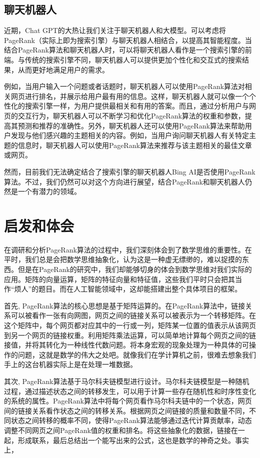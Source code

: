 \documentclass[UTF8,openany]{ctexbook}
\begin{document}
\section[聊天机器人]{聊天机器人}

近期，Chat GPT的大热让我们关注于聊天机器人和大模型。可以考虑将PageRank（实际上即为搜索引擎）与聊天机器人相结合，以提高其智能程度。当结合PageRank算法和聊天机器人时，可以将聊天机器人看作是一个搜索引擎的前端。与传统的搜索引擎不同，聊天机器人可以提供更加个性化和交互式的搜索结果，从而更好地满足用户的需求。

例如，当用户输入一个问题或者话题时，聊天机器人可以使用PageRank算法对相关网页进行排名，并展示给用户最有用的信息。这样，聊天机器人就可以像一个个性化的搜索引擎一样，为用户提供最相关和有用的答案。而且，通过分析用户与网页的交互行为，聊天机器人可以不断学习和优化PageRank算法的权重和参数，提高其预测和推荐的准确性。另外，聊天机器人还可以使用PageRank算法来帮助用户发现与他们感兴趣的主题相关的内容。例如，当用户询问聊天机器人有关特定主题的信息时，聊天机器人可以使用PageRank算法来推荐与该主题相关的最佳文章或网页。

然而，目前我们无法确定结合了搜索引擎的聊天机器人Bing AI是否使用PageRank算法。不过，我们仍然可以对这个方向进行展望，结合PageRank和聊天机器人仍然是一个有潜力的领域。

\chapter[启发和体会]{启发和体会}
\thispagestyle{fancy}

在调研和分析PageRank算法的过程中，我们深刻体会到了数学思维的重要性。在平时，我们总是会把数学思维抽象化，认为这是一种虚无缥缈的，难以捉摸的东西。但是在PageRank的研究中，我们却能够切身的体会到数学思维对我们实际的应用。矩阵的向量运算，矩阵的特征向量和特征值，这些我们平时只会把其当作“烦人”的题目。而在人工智能领域中，这却能搭建出整个具体项目的框架。

首先, PageRank算法的核心思想是基于矩阵运算的。在PageRank算法中，链接关系可以被看作一张有向网图，网页之间的链接关系可以被表示为一个转移矩阵。在这个矩阵中，每个网页都对应其中的一行或一列，矩阵某一位置的值表示从该网页到另一个网页的链接权重。利用矩阵乘法运算，可以简单地计算每个网页之间的链接值，并将其转化为一种线性代数问题。将本身宏观的现象处理为一种具体的可操作的问题，这就是数学的伟大之处吧。就像我们在学计算机之前，很难去想象我们手上的这台机器实际上是在处理一堆数据。

其次, PageRank算法基于马尔科夫链模型进行设计。马尔科夫链模型是一种随机过程，通过描述状态之间的转移发生，可以用于计算一些存在随机性和时序性变化的系统的属性。PageRank算法中将每个网页看作马尔科夫链中的一个状态，网页间的链接关系看作状态之间的转移关系。根据网页之间链接的质量和数量不同，不同状态之间转移的概率不同，使得PageRank算法能够通过迭代计算贡献率，动态调整不同网页之间PageRank值的权重和排名。将这些抽象化的数据，链接在一起，形成联系，最后总结出一个能写出来的公式，这也是数学的神奇之处。事实上，
\end{document}
